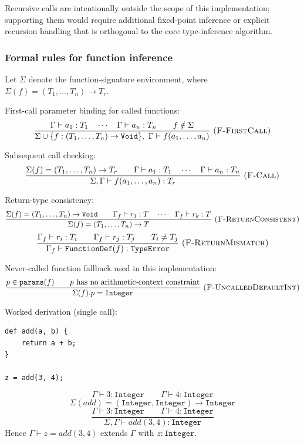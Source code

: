 Recursive calls are intentionally outside the scope of this implementation;
supporting them would require additional fixed-point inference or explicit
recursion handling that is orthogonal to the core type-inference algorithm.

\subsubsection*{Formal rules for function inference}
Let $\Sigma$ denote the function-signature environment, where
$\Sigma(f) = (T_1,\ldots,T_n) \rightarrow T_r$.

First-call parameter binding for called functions:
\[
  \frac{\Gamma \vdash a_1 : T_1 \quad \cdots \quad \Gamma \vdash a_n : T_n \qquad f \notin \Sigma}
       {\Sigma \cup \{f:(T_1,\ldots,T_n)\rightarrow \texttt{Void}\},\ \Gamma \vdash f(a_1,\ldots,a_n)}
\ \textsc{(F-FirstCall)}
\]

Subsequent call checking:
\[
  \frac{\Sigma(f)=(T_1,\ldots,T_n)\rightarrow T_r \qquad
        \Gamma \vdash a_1:T_1 \quad \cdots \quad \Gamma \vdash a_n:T_n}
       {\Sigma,\Gamma \vdash f(a_1,\ldots,a_n):T_r}
\ \textsc{(F-Call)}
\]

Return-type consistency:
\[
  \frac{\Sigma(f)=(T_1,\ldots,T_n)\rightarrow \texttt{Void} \qquad
        \Gamma_f \vdash r_1:T \quad \cdots \quad \Gamma_f \vdash r_k:T}
       {\Sigma(f)=(T_1,\ldots,T_n)\rightarrow T}
\ \textsc{(F-ReturnConsistent)}
\]
\[
  \frac{\Gamma_f \vdash r_i:T_i \qquad \Gamma_f \vdash r_j:T_j \qquad T_i \neq T_j}
  {\Gamma_f \vdash \texttt{FunctionDef}(f) : \texttt{TypeError}}
\ \textsc{(F-ReturnMismatch)}
\]

Never-called function fallback used in this implementation:
\[
\frac{p \in \texttt{params}(f) \qquad p\ \text{has no arithmetic-context constraint}}
     {\Sigma(f).p = \texttt{Integer}}
\ \textsc{(F-UncalledDefaultInt)}
\]

Worked derivation (single call):
\begin{lstlisting}
def add(a, b) {
    return a + b;
}

z = add(3, 4);
\end{lstlisting}

\[
\Gamma \vdash 3 : \texttt{Integer}
\qquad
\Gamma \vdash 4 : \texttt{Integer}
\]
\[
\Sigma(add) = (\texttt{Integer},\texttt{Integer}) \rightarrow \texttt{Integer}
\]
\[
\frac{\Gamma \vdash 3 : \texttt{Integer} \qquad \Gamma \vdash 4 : \texttt{Integer}}
  {\Sigma,\Gamma \vdash add(3,4) : \texttt{Integer}}
\]
Hence $\Gamma \vdash z = add(3,4)$ extends $\Gamma$ with
$z:\texttt{Integer}$.

